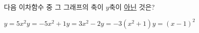 다음 이차함수 중 그 그래프의 축이 $y$축이 \underline{아닌} 것은?
\begin{choicesii}{$y=5x^2$}{$y=-5x^2+1$}{$y=3x^2-2$}{$y=-3(x^2+1)$}{$y=(x-1)^2$}\end{choicesii}
